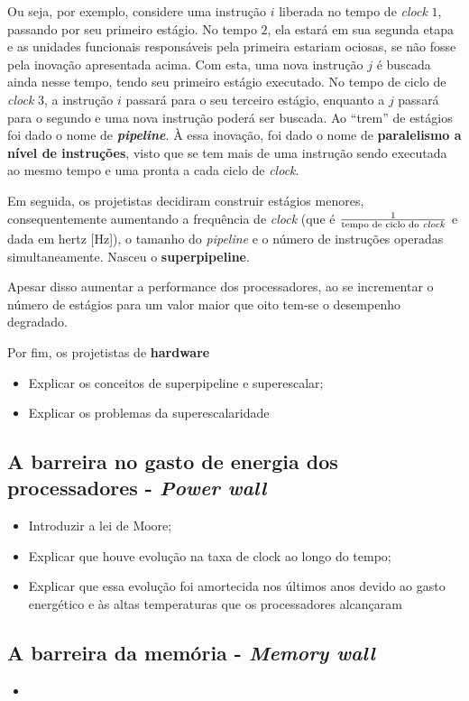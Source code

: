     	Ou seja, por exemplo, 
    	considere uma instrução $i$ liberada no tempo de \textit{clock} $1$, 
    	passando por seu primeiro estágio. No tempo $2$, ela estará em sua
    	segunda etapa e as unidades funcionais responsáveis pela primeira 
    	estariam ociosas, se não fosse pela inovação apresentada acima. Com 
    	esta, uma nova instrução $j$ é buscada ainda nesse tempo, tendo 
    	seu primeiro estágio executado. No tempo de ciclo de \textit{clock} 3,
    	a instrução $i$ passará para o seu terceiro estágio, enquanto a $j$
    	passará para o segundo e uma nova instrução poderá ser buscada. Ao 
    	``trem'' de estágios foi dado o nome de \textbf{\textit{pipeline}}. À essa 
    	inovação, foi dado o nome de \textbf{paralelismo a nível de instruções}, 
    	visto que se tem mais de uma instrução sendo executada ao mesmo tempo e 
    	uma pronta a cada ciclo de \textit{clock}.
    	
    	Em seguida, os projetistas decidiram construir estágios menores, 
    	consequentemente aumentando a frequência de \textit{clock} (que é 
	    	$\frac{1}{\text{tempo de ciclo do \textit{clock}}}$ 
    	e dada em hertz [Hz]), o tamanho do \textit{pipeline} e o número de 
    	instruções operadas simultaneamente. Nasceu o \textbf{superpipeline}. 
    	
    	Apesar disso aumentar a performance dos processadores, ao se 
    	incrementar o número de estágios para um valor maior que  oito tem-se
    	o desempenho degradado.
    	
    	Por fim, os projetistas de \textbf{hardware} 
    
        \begin{itemize}
            \item Explicar os conceitos de superpipeline e superescalar;
            \item Explicar os problemas da superescalaridade
        \end{itemize}
    
    \subsection{A barreira no gasto de energia dos processadores - \textit{Power wall}}
    
        \begin{itemize}
            \item Introduzir a lei de Moore;
            \item Explicar que houve evolução na taxa de clock ao longo do tempo;
            \item Explicar que essa evolução foi amortecida nos últimos anos devido 
            ao gasto energético e às altas temperaturas que os processadores alcançaram 
        \end{itemize}
    
    \subsection{A barreira da memória - \textit{Memory wall}}
    
	    
	    \begin{itemize}
	    	\item 
	    \end{itemize}
